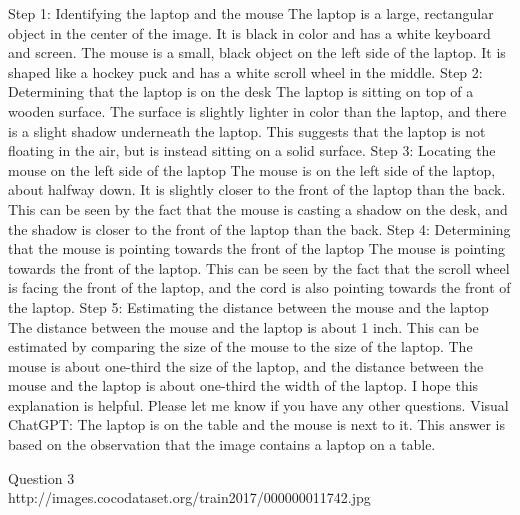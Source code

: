 \begin{enumerate}
{        Step 1: Identifying the laptop and the mouse
        The laptop is a large, rectangular object in the center of the image. It is black in color and has a white keyboard and screen. The mouse is a small, black object on the left side of the laptop. It is shaped like a hockey puck and has a white scroll wheel in the middle.
        Step 2: Determining that the laptop is on the desk
        The laptop is sitting on top of a wooden surface. The surface is slightly lighter in color than the laptop, and there is a slight shadow underneath the laptop. This suggests that the laptop is not floating in the air, but is instead sitting on a solid surface.
        Step 3: Locating the mouse on the left side of the laptop
        The mouse is on the left side of the laptop, about halfway down. It is slightly closer to the front of the laptop than the back. This can be seen by the fact that the mouse is casting a shadow on the desk, and the shadow is closer to the front of the laptop than the back.
        Step 4: Determining that the mouse is pointing towards the front of the laptop
        The mouse is pointing towards the front of the laptop. This can be seen by the fact that the scroll wheel is facing the front of the laptop, and the cord is also pointing towards the front of the laptop.
        Step 5: Estimating the distance between the mouse and the laptop
        The distance between the mouse and the laptop is about 1 inch. This can be estimated by comparing the size of the mouse to the size of the laptop. The mouse is about one-third the size of the laptop, and the distance between the mouse and the laptop is about one-third the width of the laptop. I hope this explanation is helpful. Please let me know if you have any other questions.}
        \subitem Visual ChatGPT: The laptop is on the table and the mouse is next to it. This answer is based on the observation that the image contains a laptop on a table.
    \end{enumerate}
Question 3\\
http://images.cocodataset.org/train2017/000000011742.jpg
